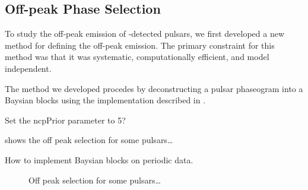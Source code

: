 \subsection{Off-peak Phase Selection}
\label{subsec:off_peak_defintion}



To study the off-peak emission of \lat-detected pulsars, we first
developed a new method for defining the off-peak emission.
The primary constraint for this method was that it was systematic,
computationally efficient, and model independent.

The method we developed procedes by deconstructing a pulsar phaseogram
into a Baysian blocks using the implementation described in \cite{Jackson_Bayesian_Blocks_2003}.

Set the ncpPrior parameter to 5?

 shows the off peak selection for some pulsars\dots

How to implement Baysian blocks on periodic data.

\begin{figure}
  \ifdefined\bwfigures
  \else
  \fi
  \caption{Off peak selection for some pulsars\dots}
  \label{fig:off_peak_select}
\end{figure}

